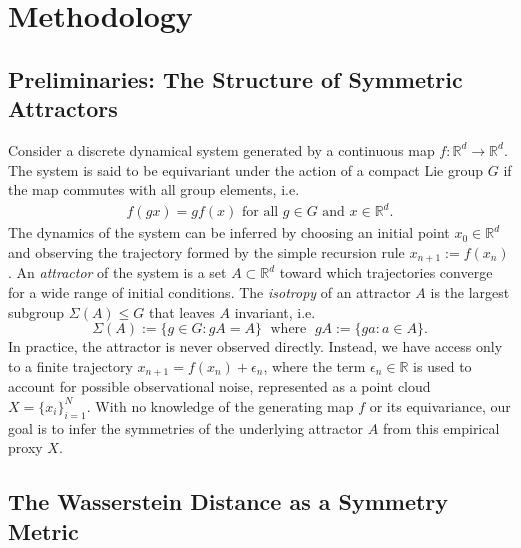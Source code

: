 \documentclass[11pt]{amsart}
\def\br{{\mathbb{R}}}
\def\br{\mathbb R}
\begin{document}
\section{Methodology}\label{sec:methodology}

\subsection{Preliminaries: The Structure of Symmetric Attractors}
Consider a discrete dynamical system generated by a continuous map $f: \br^d \to \br^d$. The system is said to be equivariant under the action of a compact Lie group $G$ if the map commutes with all group elements, i.e.
\begin{align*}
    f(g x) = g f(x) \text{ for all } g \in G \text{ and } x \in \br^d.
\end{align*}
The dynamics of the system can be inferred by choosing an initial point $x_0 \in \br^d$ and observing the trajectory formed by the simple recursion rule $x_{n+1} := f(x_n)$. An \emph{attractor} of the system is a set $A \subset \mathbb{R}^d$ toward which trajectories converge for a wide range of initial conditions. The \emph{isotropy} of an attractor $A$ is the largest subgroup $\Sigma(A) \le G$ that leaves $A$ invariant, i.e.
\[
\Sigma(A) := \{ g \in G: gA = A\} \; \text{ where } \; gA := \{ga : a \in A\}.
\]
In practice, the attractor is never observed directly. Instead, we have access only to a finite trajectory $x_{n+1} = f(x_n) +   \epsilon_n$, where the term $\epsilon_n \in \br$ is used to account for possible observational noise, represented as a point cloud $X = \{ x_i \}_{i=1}^N.$
With no knowledge of the generating map $f$ or its equivariance, our goal is to infer the symmetries of the underlying attractor $A$ from this empirical proxy $X$.
 
\subsection{The Wasserstein Distance as a Symmetry Metric}
\end{document}
